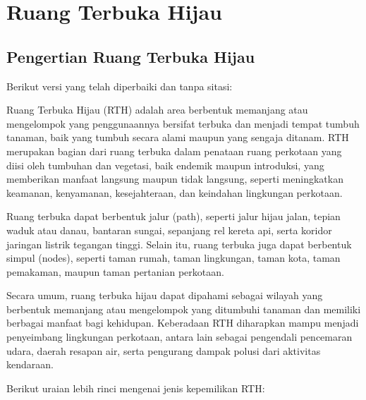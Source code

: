 \documentclass[../rumukota.tex]{subfiles}
\begin{document}
\section{Ruang Terbuka Hijau}%
\label{sec:Ruang Terbuka Hijau}

\subsection{Pengertian Ruang Terbuka Hijau}%
\label{sub:Pengertian Ruang Terbuka Hijau}

Berikut versi yang telah diperbaiki dan tanpa sitasi:

Ruang Terbuka Hijau (RTH) adalah area berbentuk memanjang atau mengelompok yang penggunaannya bersifat terbuka dan menjadi tempat tumbuh tanaman, baik yang tumbuh secara alami maupun yang sengaja ditanam. RTH merupakan bagian dari ruang terbuka dalam penataan ruang perkotaan yang diisi oleh tumbuhan dan vegetasi, baik endemik maupun introduksi, yang memberikan manfaat langsung maupun tidak langsung, seperti meningkatkan keamanan, kenyamanan, kesejahteraan, dan keindahan lingkungan perkotaan.

Ruang terbuka dapat berbentuk jalur (path), seperti jalur hijau jalan, tepian waduk atau danau, bantaran sungai, sepanjang rel kereta api, serta koridor jaringan listrik tegangan tinggi. Selain itu, ruang terbuka juga dapat berbentuk simpul (nodes), seperti taman rumah, taman lingkungan, taman kota, taman pemakaman, maupun taman pertanian perkotaan.

Secara umum, ruang terbuka hijau dapat dipahami sebagai wilayah yang berbentuk memanjang atau mengelompok yang ditumbuhi tanaman dan memiliki berbagai manfaat bagi kehidupan. Keberadaan RTH diharapkan mampu menjadi penyeimbang lingkungan perkotaan, antara lain sebagai pengendali pencemaran udara, daerah resapan air, serta pengurang dampak polusi dari aktivitas kendaraan.

Berikut uraian lebih rinci mengenai jenis kepemilikan RTH:







\end{document}

